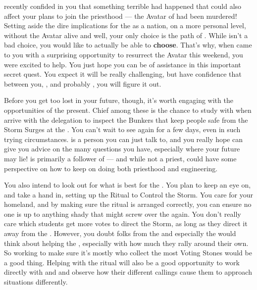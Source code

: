 \documentclass[char]{GL2020}
\begin{document}
\cFlowPriest{} recently confided in you that something terrible had happened that could also affect your plans to join the priesthood — the Avatar of \cEbb{} had been murdered! Setting aside the dire implications for the \pShip{} as a nation, on a more personal level, without the \cEbb{} Avatar alive and well, your only choice is the path of \cFlow{}. While \cFlow{} isn't a bad choice, you would like to actually be able to \textbf{choose}. That's why, when \cFlowPriest{} came to you with a surprising opportunity to resurrect the Avatar this weekend, you were excited to help. You just hope you can be of assistance in this important secret quest. You expect it will be really challenging, but have confidence that between you, \cFlowPriest{}, \cEbbPriest{} and probably \cWarlordDaughter{}, you will figure it out.

Before you get too lost in your future, though, it's worth engaging with the opportunities of the present. Chief among these is the chance to study with \cBunker{} when \cBunker{\they} arrive\cBunker{\verbs} with the \pShip{} delegation to inspect the Bunkers that keep people safe from the Storm Surges at the \pSc{}. You can’t wait to see \cBunker{} again for a few days, even in such trying circumstances. \cBunker{} is a person you can just talk to, and you really hope \cBunker{\they} can give you advice on the many questions you have, especially where your future may lie! \cBunker{} is primarily a follower of \cEbb{} — and while not a priest, \cBunker{\they} could have some perspective on how to keep on doing both priesthood and engineering.  

You also intend to look out for what is best for the \pShip{}. You plan to keep an eye on, and take a hand in, setting up the Ritual to Control the Storm. You care for your homeland, and by making sure the ritual is arranged correctly, you can ensure no one is up to anything shady that might screw over the \pShippies{} again. You don't really care which students get more votes to direct the Storm, as long as they direct it away from the \pShip{}. However, you doubt folks from the \pTech{} and especially the \pFarm{} would think about helping the \pShip{}, especially with how much they rally around their own. So working to make sure it's mostly \pShippies{} who collect the most Voting Stones would be a good thing. Helping with the ritual will also be a good opportunity to work directly with \cEbbPriest{} and \cFlowPriest{} and observe how their different callings cause them to approach situations differently.  
\end{document}
